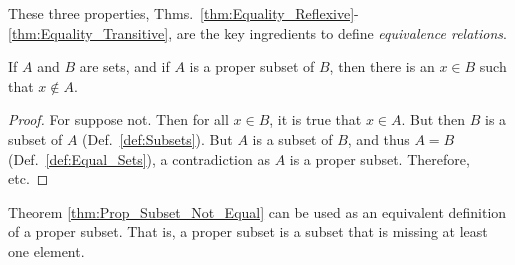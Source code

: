         These three properties,
        Thms.~\ref{thm:Equality_Reflexive}-%
        \ref{thm:Equality_Transitive}, are the key
        ingredients to define \textit{equivalence relations}.
        \begin{theorem}
            \label{thm:Prop_Subset_Not_Equal}%
            If $A$ and $B$ are sets, and if $A$ is a proper
            subset of $B$, then there is an $x\in{B}$ such
            that $x\notin{A}$.
        \end{theorem}
        \begin{proof}
            For suppose not. Then for all $x\in{B}$,
            it is true that $x\in{A}$. But then
            $B$ is a subset of $A$ (Def.~\ref{def:Subsets}).
            But $A$ is a subset of $B$, and thus $A=B$
            (Def.~\ref{def:Equal_Sets}), a contradiction as
            $A$ is a proper subset. Therefore, etc.
        \end{proof}
        Theorem \ref{thm:Prop_Subset_Not_Equal} can
        be used as an equivalent definition of a proper
        subset. That is, a proper subset is a subset that
        is missing at least one element.